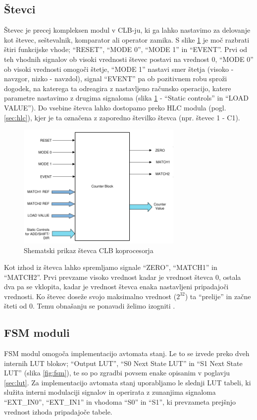 \documentclass[a4paper]{article}
\begin{document}
\subsection{Števci}
Števec je precej kompleksen modul v CLB-ju, ki ga lahko nastavimo za delovanje kot števec, seštevalnik, komparator ali operator zamika. S slike \ref{fig:stevec} je moč razbrati štiri funkcijske vhode; ``RESET'', ``MODE 0'', ``MODE 1'' in ``EVENT''. Prvi od teh vhodnih signalov ob visoki vrednosti števec postavi na vrednost 0, ``MODE 0'' ob visoki vrednosti omogoči štetje, ``MODE 1'' nastavi smer štetja (visoko - navzgor, nizko - navzdol), signal ``EVENT'' pa ob pozitivnem robu sproži dogodek, na katerega ta odreagira z nastavljeno računsko operacijo, katere parametre nastavimo z drugima signaloma (slika \ref{fig:stevec} - ``Static controls'' in ``LOAD VALUE''). Do vsebine števca lahko dostopamo preko HLC modula (pogl. \ref{sec:hlc}), kjer je ta označena z zaporedno številko števca (npr. števec 1 - C1).

\begin{figure}[htb]
    \centerline{\includegraphics[width=8cm]{shema_stevec}}
    \caption{Shematski prikaz števca CLB koprocesorja \cite[Pogl.~26.4.2.1]{mcu-ref-manual}}
    \label{fig:stevec} 
\end{figure} 

Kot izhod iz števca lahko spremljamo signale ``ZERO'', ``MATCH1'' in ``MATCH2''. Prvi prevzame visoko vrednost kadar je vrednost števca 0, ostala dva pa se vklopita, kadar je vrednost števca enaka nastavljeni pripadajoči vrednosti. Ko števec doseže svojo maksimalno vrednost ($2^{32}$) ta ``prelije'' in začne šteti od 0. Temu obnašanju se ponavadi želimo izogniti \cite[Pogl.~26.4.2]{mcu-ref-manual}.

\subsection{FSM moduli}
FSM modul omogoča implementacijo avtomata stanj. Le to se izvede preko dveh internih LUT blokov; ``Output LUT'', ``S0 Next State LUT'' in ``S1 Next State LUT'' (slika \ref{fig:fsm}), te so po zgradbi povsem enake opisanim v poglavju \ref{sec:lut}. Za implementacijo avtomata stanj uporabljamo le slednji LUT tabeli, ki služita interni modulaciji signalov in operirata z zunanjima signaloma ``EXT\_IN0'', ``EXT\_IN1'' in vhodoma ``S0'' in ``S1'', ki prevzameta prejšnjo vrednost izhoda pripadajoče tabele.
\end{document}
